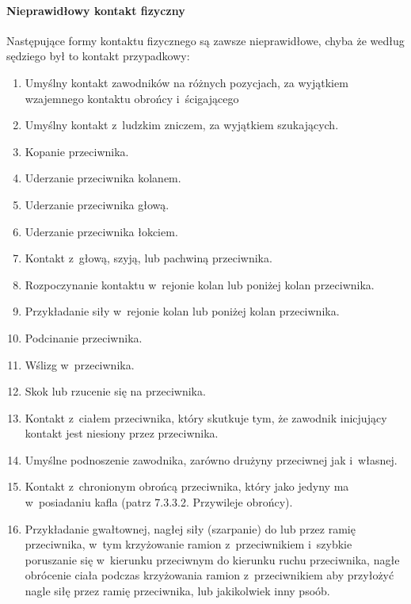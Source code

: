 \documentclass[12pt]{article}
\begin{document}
\paragraph{Nieprawidłowy kontakt fizyczny}
Następujące formy
kontaktu fizycznego są zawsze nieprawidłowe, chyba że według sędziego
był to kontakt przypadkowy:

\begin{enumerate}
	\item
	      Umyślny kontakt zawodników na różnych pozycjach, za wyjątkiem
	      wzajemnego kontaktu obrońcy i~ścigającego
	\item
	      Umyślny kontakt z~ludzkim zniczem, za wyjątkiem szukających.
	\item
	      Kopanie przeciwnika.
	\item
	      Uderzanie przeciwnika kolanem.
	\item
	      Uderzanie przeciwnika głową.
	\item
	      Uderzanie przeciwnika łokciem.
	\item
	      Kontakt z~głową, szyją, lub pachwiną przeciwnika.
	\item
	      Rozpoczynanie kontaktu w~rejonie kolan lub poniżej kolan przeciwnika.
	\item
	      Przykładanie siły w~rejonie kolan lub poniżej kolan przeciwnika.
	\item
	      Podcinanie przeciwnika.
	\item
	      Wślizg w~przeciwnika.
	\item
	      Skok lub rzucenie się na przeciwnika.
	\item
	      Kontakt z~ciałem przeciwnika, który skutkuje tym, że zawodnik
	      inicjujący kontakt jest niesiony przez przeciwnika.
	\item
	      Umyślne podnoszenie zawodnika, zarówno drużyny przeciwnej jak i~własnej.
	\item
	      Kontakt z~chronionym obrońcą przeciwnika, który jako jedyny ma w~posiadaniu kafla (patrz 7.3.3.2. Przywileje obrońcy).
	\item
	      Przykładanie gwałtownej, nagłej siły (szarpanie) do lub przez ramię
	      przeciwnika, w~tym krzyżowanie ramion z~przeciwnikiem i~szybkie
	      poruszanie się w~kierunku przeciwnym do kierunku ruchu przeciwnika,
	      nagłe obrócenie ciała podczas krzyżowania ramion z~przeciwnikiem aby
	      przyłożyć nagle siłę przez ramię przeciwnika, lub jakikolwiek inny
	      psoób.
\end{enumerate}
\end{document}
